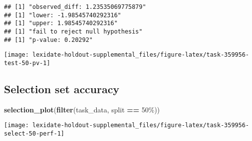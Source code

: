 \documentclass[
]{book}
\newenvironment{Shaded}{\begin{snugshade}}{\end{snugshade}}
\newcommand{\AttributeTok}[1]{\textcolor[rgb]{0.13,0.29,0.53}{#1}}
\newcommand{\DecValTok}[1]{\textcolor[rgb]{0.00,0.00,0.81}{#1}}
\newcommand{\FunctionTok}[1]{\textcolor[rgb]{0.13,0.29,0.53}{\textbf{#1}}}
\newcommand{\NormalTok}[1]{#1}
\newcommand{\OtherTok}[1]{\textcolor[rgb]{0.56,0.35,0.01}{#1}}
\newcommand{\SpecialCharTok}[1]{\textcolor[rgb]{0.81,0.36,0.00}{\textbf{#1}}}
\newcommand{\StringTok}[1]{\textcolor[rgb]{0.31,0.60,0.02}{#1}}
\begin{document}
\begin{Shaded}
\end{Shaded}

\begin{verbatim}
## [1] "observed_diff: 1.23535069775879"
## [1] "lower: -1.98545740292316"
## [1] "upper: 1.98545740292316"
## [1] "fail to reject null hypothesis"
## [1] "p-value: 0.20292"
\end{verbatim}

\texttt{[image: lexidate-holdout-supplemental\_files/figure-latex/task-359956-test-50-pv-1]}

\hypertarget{selection-set-accuracy-27}{%
\subsection{Selection set accuracy}\label{selection-set-accuracy-27}}

\begin{Shaded}
\begin{Highlighting}[]
\FunctionTok{selection\_plot}\NormalTok{(}\FunctionTok{filter}\NormalTok{(task\_data, split }\SpecialCharTok{==} \StringTok{\textquotesingle{}50\%\textquotesingle{}}\NormalTok{))}
\end{Highlighting}
\end{Shaded}

\texttt{[image: lexidate-holdout-supplemental\_files/figure-latex/task-359956-select-50-perf-1]}
\end{document}
